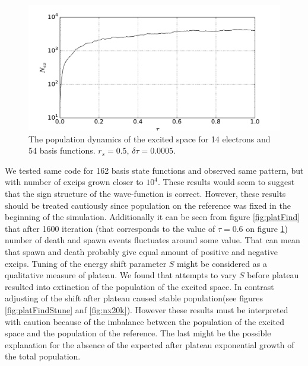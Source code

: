 \documentclass[twoside,english]{uiofysmaster}
\begin{document}
\begin{figure}[ht!]
	\centering
	\includegraphics[width=0.8\linewidth]{Nex2000new}
	\caption{The population dynamics of the excited space for 14 electrons and 54 basis functions. $r_s=0.5$, $\delta \tau=0.0005$.}
	\label{fig:nx2k}
\end{figure}

We tested same code for 162 basis state functions and observed same pattern, but with number of excips grown closer to $10^4$. These results would seem to suggest that the sign structure of the wave-function is correct.
However, these results should be treated cautiously since population on the reference was fixed in the beginning of the simulation. Additionally it can be seen from figure \ref{fig:platFind} that after 1600 iteration (that corresponds to the value of $\tau=0.6$ on figure \ref{fig:nx2k}) number of death and spawn events fluctuates around some value. That can mean that spawn and death probably give equal amount of positive and negative excips.
Tuning of the energy shift parameter $S$ might be considered as a qualitative measure of plateau.
We found that attempts to vary $S$ before plateau resulted into extinction of the population of the excited space. In contrast adjusting of the shift after plateau caused stable population(see figures \ref{fig:platFindStune} anf \ref{fig:nx20k}).
However these results must be interpreted with caution because of the imbalance between the population of the excited space and the population of the reference. The last might be the possible explanation for the absence of the expected after plateau exponential growth of the total population.	
\end{document}
